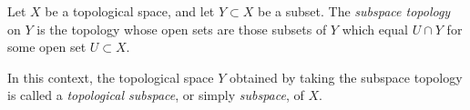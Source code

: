 \documentclass[12pt]{article}
\begin{document}
Let $X$ be a topological space, and let $Y \subset X$ be a subset. The {\em subspace topology} on $Y$ is the topology whose open sets are those subsets of $Y$ which equal $U \cap Y$ for some open set $U \subset X$.

In this context, the topological space $Y$ obtained by taking the subspace topology is called a {\em topological subspace}, or simply {\em subspace}, of $X$.
\end{document}
